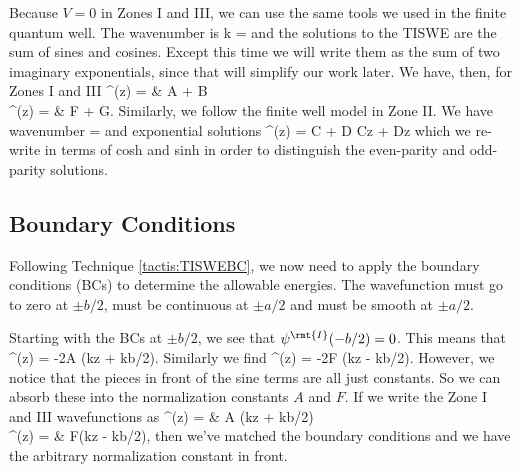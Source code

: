 Because $V=0$ in Zones I and III, we can use the same tools we used in the finite quantum well. The wavenumber is
\beq
k = 
\eeq
and the solutions to the TISWE are the sum of sines and cosines. Except this time we will write them as the sum of two imaginary exponentials, since that will simplify our work later. We have, then, for Zones I and III
\bas
\psi^(z) = & A + B\\
\psi^(z) = & F + G.
\eas
Similarly, we follow the finite well model in Zone II. We have wavenumber 
\beq
\kappa = 
\eeq
and exponential solutions
\beq
\psi^(z) = C + D \rightarrow C\;\kappa z + D\;\kappa z
\eeq{}%
which we re-write in terms of cosh and sinh in order to distinguish the even-parity and odd-parity solutions.

\subsection{Boundary Conditions}
Following Technique \ref{tactis:TISWEBC}, we now need to apply the boundary conditions (BCs) to determine the allowable energies. The wavefunction must go to zero at $\pm b/2$, must be continuous at $\pm a/2$ and must be smooth at $\pm a/2$.

Starting with the BCs at $\pm b/2$, we see that $\psi^\rmt{I}(-b/2)=0$. This means that%
\beq
\psi^(z) = -2\I A \sin\left(kz + kb/2\right).
\eeq
Similarly we find
\beq
\psi^(z) = -2\I F \sin\left(kz - kb/2\right).
\eeq
However, we notice that the pieces in front of the sine terms are all just constants. So we can absorb these into the normalization constants $A$ and $F$. If we write the Zone I and III wavefunctions as
\bas
\psi^(z) = & A \sin(kz + kb/2)\\
\psi^(z) = & F\sin(kz - kb/2),
\eas
then we've matched the boundary conditions and we have the arbitrary normalization constant in front.

